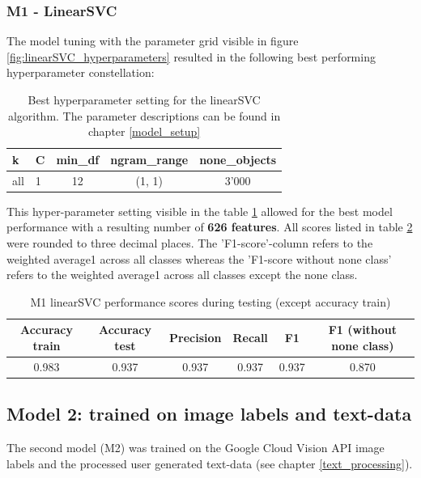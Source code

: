 \subsubsection{M1 - LinearSVC}
The model tuning with the parameter grid visible in figure \ref{fig:linearSVC_hyperparameters} resulted in the following best performing hyperparameter constellation:

\begin{table}[ht]
\begin{center}
\caption{Best hyperparameter setting for the linearSVC algorithm. The parameter descriptions can be found in chapter \ref{model_setup}}\vspace{1ex}
\label{tab:m1_linearSVC_bestParams}
\begin{tabular}{llccc}\hline
k & C & min\_df & ngram\_range & none\_objects \\ \hline
all & 1 & 12 & (1, 1) & 3'000 \\ \hline
\end{tabular}
\end{center}
\end{table}

This hyper-parameter setting visible in the table \ref{tab:m1_linearSVC_bestParams} allowed for the best model performance with a resulting number of \textbf{626 features}. All scores listed in table \ref{tab:m1_linearSVC_bestscores} were rounded to three decimal places. The 'F1-score'-column refers to the weighted average1 across all classes whereas the 'F1-score without none class' refers to the weighted average1 across all classes except the none class.

\begin{table}[ht]
\begin{center}
\caption{M1 linearSVC performance scores during testing (except accuracy train)}\vspace{1ex}
\label{tab:m1_linearSVC_bestscores}
\begin{tabular}{cccccc}\hline
Accuracy train & Accuracy test & Precision & Recall & F1 & F1 (without none class)\\ \hline
0.983 & 0.937 & 0.937 & 0.937 & 0.937 & 0.870 \\ \hline
\end{tabular}
\end{center}
\end{table}

\subsection{Model 2: trained on image labels and text-data}
The second model (M2) was trained on the Google Cloud Vision API image labels and the processed user generated text-data (see chapter \ref{text_processing}).

